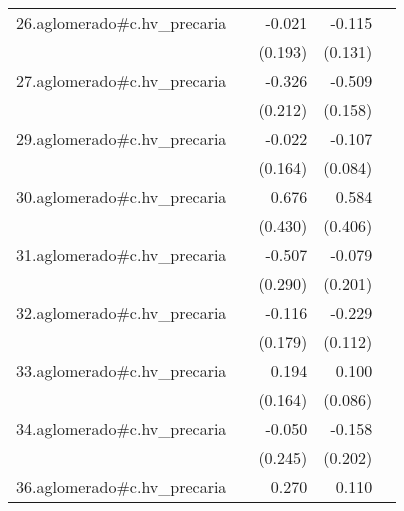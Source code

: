 {\begin{longtable}{l*{4}{D{.}{.}{-1}}}
\addlinespace
26.aglomerado#c.hv\_precaria&                     &      -0.021         &      -0.115         &                     \\
            &                     &     (0.193)         &     (0.131)         &                     \\
\addlinespace
27.aglomerado#c.hv\_precaria&                     &      -0.326         &      -0.509\sym{**} &                     \\
            &                     &     (0.212)         &     (0.158)         &                     \\
\addlinespace
29.aglomerado#c.hv\_precaria&                     &      -0.022         &      -0.107         &                     \\
            &                     &     (0.164)         &     (0.084)         &                     \\
\addlinespace
30.aglomerado#c.hv\_precaria&                     &       0.676         &       0.584         &                     \\
            &                     &     (0.430)         &     (0.406)         &                     \\
\addlinespace
31.aglomerado#c.hv\_precaria&                     &      -0.507         &      -0.079         &                     \\
            &                     &     (0.290)         &     (0.201)         &                     \\
\addlinespace
32.aglomerado#c.hv\_precaria&                     &      -0.116         &      -0.229\sym{*}  &                     \\
            &                     &     (0.179)         &     (0.112)         &                     \\
\addlinespace
33.aglomerado#c.hv\_precaria&                     &       0.194         &       0.100         &                     \\
            &                     &     (0.164)         &     (0.086)         &                     \\
\addlinespace
34.aglomerado#c.hv\_precaria&                     &      -0.050         &      -0.158         &                     \\
            &                     &     (0.245)         &     (0.202)         &                     \\
\addlinespace
36.aglomerado#c.hv\_precaria&                     &       0.270         &       0.110         &                     \\

\end{longtable}}
